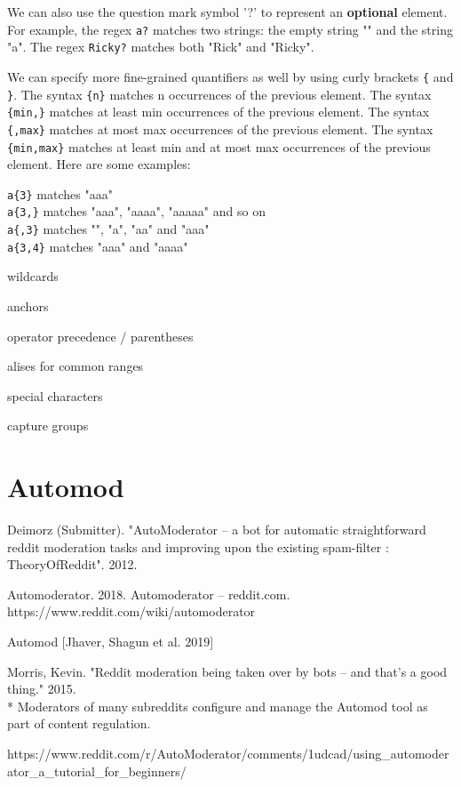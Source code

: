 \documentclass[class=book, crop=false]{standalone}
\providecommand{\keyterm}[1]{\textbf{#1}\marginnote{\scriptsize \textbf{#1}}}
\providecommand{\regex}[1]{\texttt{#1}}
\begin{document}
We can also use the question mark symbol '?' to represent an \keyterm{optional} element. For example, the regex \regex{a?} matches two strings: the empty string "" and the string "a". The regex \regex{Ricky?} matches both "Rick" and "Ricky".

We can specify more fine-grained quantifiers as well by using curly brackets \regex{\{} and \regex{\}}. The syntax \regex{\{n\}} matches n occurrences of the previous element. The syntax \regex{\{min,\}} matches at least min occurrences of the previous element. The syntax \regex{\{,max\}} matches at most max occurrences of the previous element. The syntax \regex{\{min,max\}} matches at least min and at most max occurrences of the previous element. Here are some examples:
\begin{center}
    \regex{a\{3\}} matches "aaa"\\
    \regex{a\{3,\}} matches "aaa", "aaaa", "aaaaa" and so on\\
    \regex{a\{,3\}} matches "", "a", "aa" and "aaa"\\
    \regex{a\{3,4\}} matches "aaa" and "aaaa"
\end{center}

wildcards

anchors

operator precedence / parentheses

alises for common ranges

special characters

capture groups

\section{Automod}

Deimorz (Submitter). "AutoModerator -- a bot for automatic straightforward reddit moderation tasks and improving upon the existing spam-filter : TheoryOfReddit". 2012.

Automoderator. 2018. Automoderator -- reddit.com. https://www.reddit.com/wiki/automoderator

Automod [Jhaver, Shagun et al. 2019]

Morris, Kevin. "Reddit moderation being taken over by bots -- and that's a good thing." 2015.\\
 * Moderators of many subreddits configure and manage the Automod tool as part of content regulation.

https://www.reddit.com/r/AutoModerator/comments/1udcad/using_automoderator_a_tutorial_for_beginners/
\end{document}
